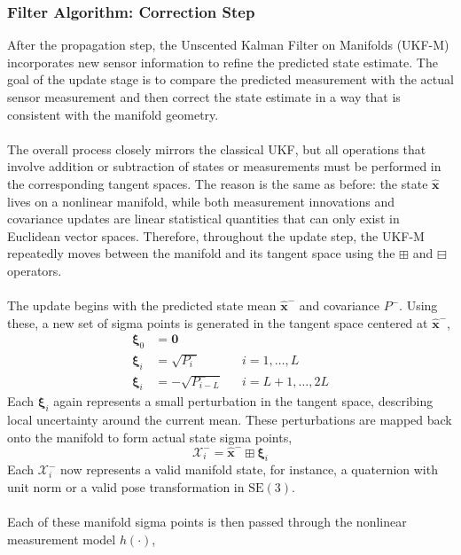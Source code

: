 \subsubsection{Filter Algorithm: Correction Step}
After the propagation step, the Unscented Kalman Filter on Manifolds (UKF-M) incorporates new sensor information to refine the predicted state estimate. The goal of the update stage is to compare the predicted measurement with the actual sensor measurement and then correct the state estimate in a way that is consistent with the manifold geometry.  
\\ \\
The overall process closely mirrors the classical UKF, but all operations that involve addition or subtraction of states or measurements must be performed in the corresponding tangent spaces. The reason is the same as before: the state $\hat{\mathbf{x}}$ lives on a nonlinear manifold, while both measurement innovations and covariance updates are linear statistical quantities that can only exist in Euclidean vector spaces. Therefore, throughout the update step, the UKF-M repeatedly moves between the manifold and its tangent space using the $\boxplus$ and $\boxminus$ operators.  
\\ \\
The update begins with the predicted state mean $\hat{\mathbf{x}}^-$ and covariance $P^-$. Using these, a new set of sigma points is generated in the tangent space centered at $\hat{\mathbf{x}}^-$,  
\begin{equation}
    \begin{aligned}
        \boldsymbol{\xi}_0 &= \mathbf{0} \\
        \boldsymbol{\xi}_i &= \sqrt{P_i^-}              && i = 1, \ldots, L \\
        \boldsymbol{\xi}_i &= -\sqrt{P_{i - L}^-}       && i = L+1, \ldots, 2L
    \end{aligned}
\end{equation}
Each $\boldsymbol{\xi}_i$ again represents a small perturbation in the tangent space, describing local uncertainty around the current mean. These perturbations are mapped back onto the manifold to form actual state sigma points,  
$$
    \mathcal{X}_i^- = \hat{\mathbf{x}}^- \boxplus \boldsymbol{\xi}_i
$$
Each $\mathcal{X}_i^-$ now represents a valid manifold state, for instance, a quaternion with unit norm or a valid pose transformation in $\mathrm{SE}(3)$.  
\\ \\
Each of these manifold sigma points is then passed through the nonlinear measurement model $h(\cdot)$,  
